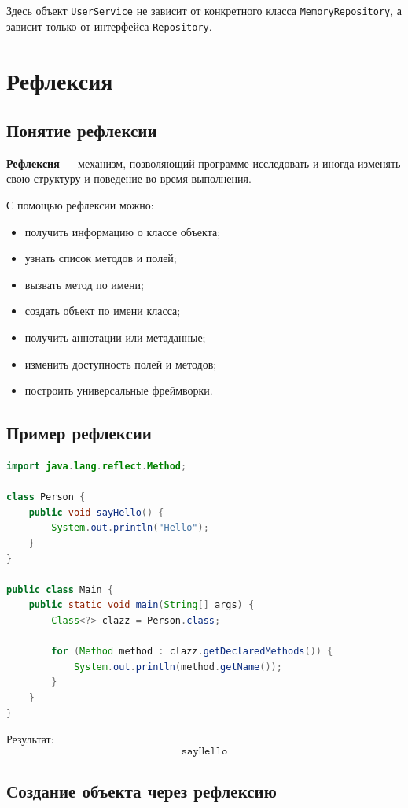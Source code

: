 \documentclass[12pt,a4paper]{article}
\begin{document}
Здесь объект \texttt{UserService} не зависит от конкретного класса \texttt{MemoryRepository}, а зависит только от интерфейса \texttt{Repository}.

\section{Рефлексия}

\subsection{Понятие рефлексии}

\textbf{Рефлексия} --- механизм, позволяющий программе исследовать и иногда изменять свою структуру и поведение во время выполнения.

С помощью рефлексии можно:
\begin{itemize}
    \item получить информацию о классе объекта;
    \item узнать список методов и полей;
    \item вызвать метод по имени;
    \item создать объект по имени класса;
    \item получить аннотации или метаданные;
    \item изменить доступность полей и методов;
    \item построить универсальные фреймворки.
\end{itemize}

\subsection{Пример рефлексии}

\begin{lstlisting}[language=Java,caption={Получение информации о классе}]
import java.lang.reflect.Method;

class Person {
    public void sayHello() {
        System.out.println("Hello");
    }
}

public class Main {
    public static void main(String[] args) {
        Class<?> clazz = Person.class;

        for (Method method : clazz.getDeclaredMethods()) {
            System.out.println(method.getName());
        }
    }
}
\end{lstlisting}

Результат:
\[
\texttt{sayHello}
\]

\subsection{Создание объекта через рефлексию}
\end{document}
